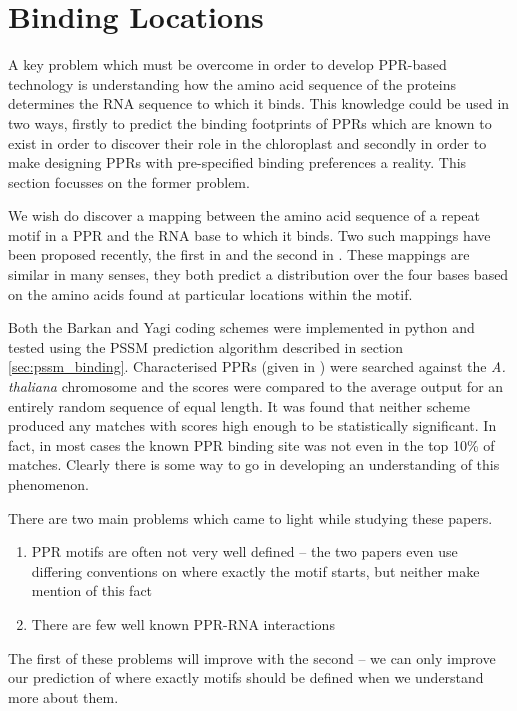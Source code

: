 \section{Binding Locations}

A key problem which must be overcome in order to develop PPR-based technology
is understanding how the amino acid sequence of the proteins determines the RNA
sequence to which it binds.
This knowledge could be used in two ways, firstly to predict the binding
footprints of PPRs which are known to exist in order to discover their role in
the chloroplast and secondly in order to make designing PPRs with pre-specified
binding preferences a reality.
This section focusses on the former problem.

We wish do discover a mapping between the amino acid sequence of a repeat
motif in a PPR and the RNA base to which it binds.
Two such mappings have been proposed recently, the first in \citet{Barkan2012}
and the second in \citet{Yagi2013}.
These mappings are similar in many senses, they both predict a distribution
over the four bases based on the amino acids found at particular locations
within the motif.

Both the Barkan and Yagi coding schemes were implemented in python and tested
using the PSSM prediction algorithm described in section
\ref{sec:pssm_binding}.
Characterised PPRs (given in \citet{Yagi2013}) were searched against the
\emph{A. thaliana} chromosome and the scores were compared to the average 
output for an entirely random sequence of equal length.
It was found that neither scheme produced any matches with scores high enough 
to be statistically significant.
In fact, in most cases the known PPR binding site was not even in the top 10\%
of matches.
Clearly there is some way to go in developing an understanding of this
phenomenon.

There are two main problems which came to light while studying these papers.
\begin{enumerate}
  \item PPR motifs are often not very well defined -- the two papers even use
    differing conventions on where exactly the motif starts, but neither make
    mention of this fact
  \item There are few well known PPR-RNA interactions
\end{enumerate}
The first of these problems will improve with the second -- we can only improve
our prediction of where exactly motifs should be defined when we understand
more about them.


